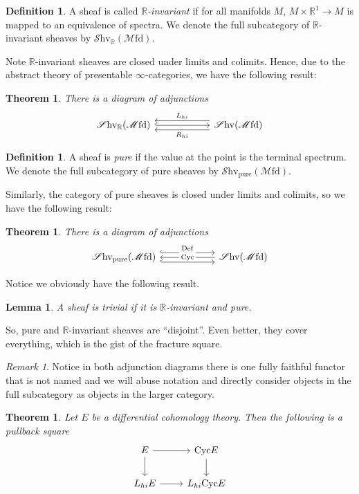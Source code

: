 \documentclass[10pt]{amsart}
\newcommand{\bR}{\mathbb{R}}
\newcommand{\Mfd}{\mathscr{M}\mathrm{fd}}
\newcommand{\Shv}{\mathscr{S}\mathrm{hv}}
\newcommand{\Def}{\mathrm{Def}}
\newcommand{\Cyc}{\mathrm{Cyc}}
\newtheorem{theorem}[equation]{Theorem}
\newtheorem{lemma}[equation]{Lemma}
\theoremstyle{definition}
\newtheorem{definition}[equation]{Definition}
\theoremstyle{remark}
\newtheorem{remark}[equation]{Remark}
\numberwithin{equation}{section}
\begin{document}
\begin{definition}
  A sheaf is called \emph{$\mathbb{R}$-invariant} if for all manifolds $M$, $M \times \bR^1 \to M$ is mapped to an equivalence of spectra. We denote the full subcategory of $\mathbb{R}$-invariant sheaves by $\Shv_{\bR}(\Mfd)$.
\end{definition}

Note $\mathbb{R}$-invariant sheaves are closed under limits and colimits. Hence, due to the abstract theory of presentable $\infty$-categories, we have the following result:

\begin{theorem}
 There is a diagram of adjunctions
 \[
 \begin{tikzcd}[column sep=2cm]
 \Shv_{\bR}(\Mfd) \arrow[r, shift left = 2, leftarrow, "L_{hi}"] \arrow[r, hookrightarrow] \arrow[r, shift right = 2, leftarrow, "R_{hi}"'] & \Shv(\Mfd) 
 \end{tikzcd}
 \]
\end{theorem}

\begin{definition}
  A sheaf is \emph{pure} if the value at the point is the terminal spectrum. We denote the full subcategory of pure sheaves by $\Shv_{\mathrm{pure}}(\Mfd)$.
\end{definition}

Similarly, the category of pure sheaves is closed under limits and colimits, so we have the following result:

\begin{theorem}
 There is a diagram of adjunctions
 \[
 \begin{tikzcd}[column sep=2cm]
 \Shv_{\mathrm{pure}}(\Mfd) \arrow[r, shift left = 2, "\Def", hookrightarrow] \arrow[r, leftarrow, "\Cyc" description] \arrow[r, shift right = 2, hookrightarrow] & \Shv(\Mfd)
 \end{tikzcd}
 \]
\end{theorem}

Notice we obviously have the following result.

\begin{lemma}
  A sheaf is \emph{trivial} if it is $\mathbb{R}$-invariant and pure.
\end{lemma}

So, pure and $\bR$-invariant sheaves are ``disjoint''. Even better, they cover everything, which is the gist of the fracture square.

\begin{remark}
Notice in both adjunction diagrams there is one fully faithful functor that is not named and we will abuse notation and directly consider objects in the full subcategory as objects in the larger category.
\end{remark}
\begin{theorem}
 Let $E$ be a differential cohomology theory. Then the following is a pullback square
 \[
  \begin{tikzcd}
    E \arrow[r] \arrow[d] & \Cyc E \arrow[d] \\ 
    L_{hi}E \arrow[r] & L_{hi}\Cyc E
  \end{tikzcd}
 \]
\end{theorem}
\end{document}
